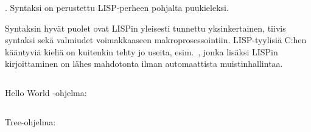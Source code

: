 
\bnfdescription.
Syntaksi on perustettu LISP-perheen pohjalta puukieleksi.

Syntaksin hyvät puolet ovat LISPin yleisesti tunnettu yksinkertainen, tiivis
syntaksi sekä valmiudet voimakkaaseen makroprosessointiin. LISP-tyylisiä C:hen
kääntyviä kieliä on kuitenkin tehty jo useita, esim.~\citet{clisp3}, jonka
lisäksi LISPin kirjoittaminen on lähes mahdotonta ilman automaattista
muistinhallintaa.

\inputminted{\bnflexer}{lisp-base.bnf}

Hello World -ohjelma:

\inputminted{lisp}{hello.lisp}

\newpage

Tree-ohjelma:

\inputminted{lisp}{tree.lisp}

